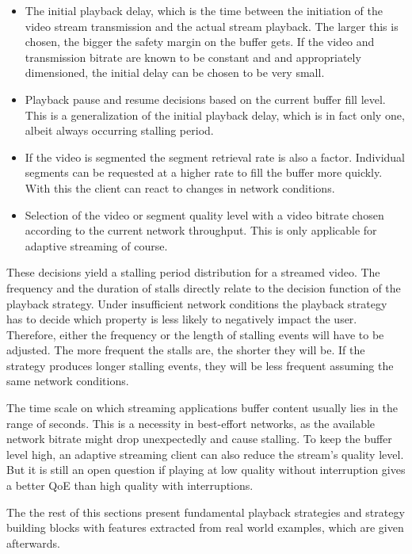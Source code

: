 \begin{itemize}
	\item The initial playback delay, which is the time between the initiation of the video stream transmission and the actual stream playback. The larger this is chosen, the bigger the safety margin on the buffer gets. If the video and transmission bitrate are known to be constant and and appropriately dimensioned, the initial delay can be chosen to be very small.

	\item Playback pause and resume decisions based on the current buffer fill level. This is a generalization of the initial playback delay, which is in fact only one, albeit always occurring stalling period.

	\item If the video is segmented the segment retrieval rate is also a factor. Individual segments can be requested at a higher rate to fill the buffer more quickly. With this the client can react to changes in network conditions.

	\item Selection of the video or segment quality level with a video bitrate chosen according to the current network throughput. This is only applicable for adaptive streaming of course.
\end{itemize}


These decisions yield a stalling period distribution for a streamed video. The frequency and the duration of stalls directly relate to the decision function of the playback strategy. Under insufficient network conditions the playback strategy has to decide which property is less likely to negatively impact the user. Therefore, either the frequency or the length of stalling events will have to be adjusted. The more frequent the stalls are, the shorter they will be. If the strategy produces longer stalling events, they will be less frequent assuming the same network conditions.

The time scale on which streaming applications buffer content usually lies in the range of seconds. This is a necessity in best-effort networks, as the available network bitrate might drop unexpectedly and cause stalling. To keep the buffer level high, an adaptive streaming client can also reduce the stream's quality level. But it is still an open question if playing at low quality without interruption gives a better \gls{QoE} than high quality with interruptions.

The the rest of this sections present fundamental playback strategies and strategy building blocks with features extracted from real world examples, which are given afterwards. 



